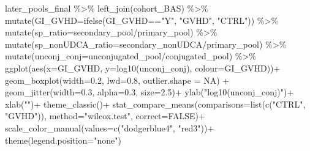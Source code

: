 \documentclass[
]{book}
\newenvironment{Shaded}{\begin{snugshade}}{\end{snugshade}}
\newcommand{\AttributeTok}[1]{\textcolor[rgb]{0.77,0.63,0.00}{#1}}
\newcommand{\ConstantTok}[1]{\textcolor[rgb]{0.00,0.00,0.00}{#1}}
\newcommand{\FloatTok}[1]{\textcolor[rgb]{0.00,0.00,0.81}{#1}}
\newcommand{\FunctionTok}[1]{\textcolor[rgb]{0.00,0.00,0.00}{#1}}
\newcommand{\NormalTok}[1]{#1}
\newcommand{\SpecialCharTok}[1]{\textcolor[rgb]{0.00,0.00,0.00}{#1}}
\newcommand{\StringTok}[1]{\textcolor[rgb]{0.31,0.60,0.02}{#1}}
\begin{document}
\begin{Shaded}
\begin{Highlighting}[]
\NormalTok{later\_pools\_final }\SpecialCharTok{\%\textgreater{}\%} 
  \FunctionTok{left\_join}\NormalTok{(cohort\_BAS) }\SpecialCharTok{\%\textgreater{}\%}
  \FunctionTok{mutate}\NormalTok{(}\AttributeTok{GI\_GVHD=}\FunctionTok{ifelse}\NormalTok{(GI\_GVHD}\SpecialCharTok{==}\StringTok{"Y"}\NormalTok{, }\StringTok{"GVHD"}\NormalTok{, }\StringTok{"CTRL"}\NormalTok{)) }\SpecialCharTok{\%\textgreater{}\%} 
  \FunctionTok{mutate}\NormalTok{(}\AttributeTok{sp\_ratio=}\NormalTok{secondary\_pool}\SpecialCharTok{/}\NormalTok{primary\_pool) }\SpecialCharTok{\%\textgreater{}\%} 
  \FunctionTok{mutate}\NormalTok{(}\AttributeTok{sp\_nonUDCA\_ratio=}\NormalTok{secondary\_nonUDCA}\SpecialCharTok{/}\NormalTok{primary\_pool) }\SpecialCharTok{\%\textgreater{}\%} 
  \FunctionTok{mutate}\NormalTok{(}\AttributeTok{unconj\_conj=}\NormalTok{unconjugated\_pool}\SpecialCharTok{/}\NormalTok{conjugated\_pool) }\SpecialCharTok{\%\textgreater{}\%} 
  \FunctionTok{ggplot}\NormalTok{(}\FunctionTok{aes}\NormalTok{(}\AttributeTok{x=}\NormalTok{GI\_GVHD, }\AttributeTok{y=}\FunctionTok{log10}\NormalTok{(unconj\_conj), }\AttributeTok{colour=}\NormalTok{GI\_GVHD))}\SpecialCharTok{+}
  \FunctionTok{geom\_boxplot}\NormalTok{(}\AttributeTok{width=}\FloatTok{0.2}\NormalTok{, }\AttributeTok{lwd=}\FloatTok{0.8}\NormalTok{, }\AttributeTok{outlier.shape =} \ConstantTok{NA}\NormalTok{) }\SpecialCharTok{+}
  \FunctionTok{geom\_jitter}\NormalTok{(}\AttributeTok{width=}\FloatTok{0.3}\NormalTok{, }\AttributeTok{alpha=}\FloatTok{0.3}\NormalTok{, }\AttributeTok{size=}\FloatTok{2.5}\NormalTok{)}\SpecialCharTok{+}
  \FunctionTok{ylab}\NormalTok{(}\StringTok{"log10(unconj\_conj)"}\NormalTok{)}\SpecialCharTok{+}
  \FunctionTok{xlab}\NormalTok{(}\StringTok{""}\NormalTok{)}\SpecialCharTok{+}
  \FunctionTok{theme\_classic}\NormalTok{()}\SpecialCharTok{+}
  \FunctionTok{stat\_compare\_means}\NormalTok{(}\AttributeTok{comparisons=}\FunctionTok{list}\NormalTok{(}\FunctionTok{c}\NormalTok{(}\StringTok{"CTRL"}\NormalTok{, }\StringTok{"GVHD"}\NormalTok{)),}
                     \AttributeTok{method=}\StringTok{"wilcox.test"}\NormalTok{,}
                     \AttributeTok{correct=}\ConstantTok{FALSE}\NormalTok{)}\SpecialCharTok{+}
  \FunctionTok{scale\_color\_manual}\NormalTok{(}\AttributeTok{values=}\FunctionTok{c}\NormalTok{(}\StringTok{"dodgerblue4"}\NormalTok{, }\StringTok{"red3"}\NormalTok{))}\SpecialCharTok{+}
  \FunctionTok{theme}\NormalTok{(}\AttributeTok{legend.position=}\StringTok{"none"}\NormalTok{)}
\end{Highlighting}
\end{Shaded}
\end{document}
